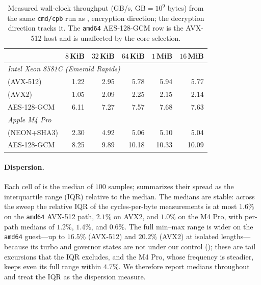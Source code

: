 \begin{table}
\centering
\caption{Measured wall-clock throughput (GB/s, $\mathrm{GB} = 10^9$ bytes) from
the same \texttt{cmd/cpb} run as , encryption direction; the
decryption direction tracks it. The \texttt{amd64} AES-128-GCM row is the AVX-512
host and is unaffected by the \TW{} core selection.}
\label{tab:throughput}
\begin{tabular}{l rrrrr}
\toprule
& $8$\,KiB & $32$\,KiB & $64$\,KiB & $1$\,MiB & $16$\,MiB \\
\midrule
\multicolumn{6}{l}{\emph{Intel Xeon 8581C (Emerald Rapids)}} \\
\quad \TW{} (AVX-512)  & 1.22 & 2.95 & 5.78 & 5.94 & 5.77 \\
\quad \TW{} (AVX2)     & 1.05 & 2.09 & 2.25 & 2.15 & 2.14 \\
\quad AES-128-GCM      & 6.11 & 7.27 & 7.57 & 7.68 & 7.63 \\
\midrule
\multicolumn{6}{l}{\emph{Apple M4 Pro}} \\
\quad \TW{} (NEON+SHA3) & 2.30 & 4.92 & 5.06 & 5.10 & 5.04 \\
\quad AES-128-GCM       & 8.25 & 9.89 & 10.18 & 10.33 & 10.09 \\
\bottomrule
\end{tabular}
\end{table}

\paragraph{Dispersion.}
Each cell of  is the median of $100$ samples;
 summarizes their spread as the interquartile range
(IQR) relative to the median. The medians are stable: across the sweep the
relative IQR of the \TW{} cycles-per-byte measurements is at most $1.6\%$
on the \texttt{amd64} AVX-512 path, $2.1\%$ on AVX2, and $1.0\%$ on the M4
Pro, with per-path medians of $1.2\%$, $1.4\%$, and $0.6\%$. The full
min--max range is wider on the \texttt{amd64} guest---up to $16.5\%$
(AVX-512) and $20.2\%$ (AVX2) at isolated lengths---because its turbo and
governor states are not under our control (); these
are tail excursions that the IQR excludes, and the M4 Pro, whose frequency
is steadier, keeps even its full range within $4.7\%$. We therefore report
medians throughout and treat the IQR as the dispersion measure.

